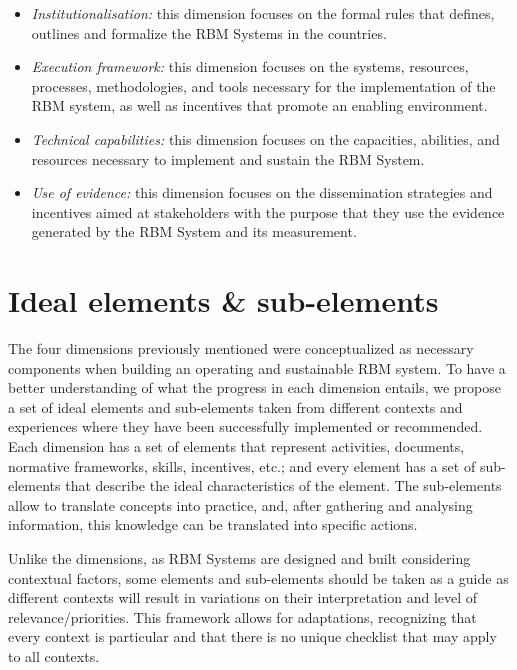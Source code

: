 \documentclass[
  10pt,
]{book}
\begin{document}
\begin{itemize}
\item
  \emph{Institutionalisation:} this dimension focuses on the formal rules that defines, outlines and formalize the RBM Systems in the countries.
\item
  \emph{Execution framework:} this dimension focuses on the systems, resources, processes, methodologies, and tools necessary for the implementation of the RBM system, as well as incentives that promote an enabling environment.
\item
  \emph{Technical capabilities:} this dimension focuses on the capacities, abilities, and resources necessary to implement and sustain the RBM System.
\item
  \emph{Use of evidence:} this dimension focuses on the dissemination strategies and incentives aimed at stakeholders with the purpose that they use the evidence generated by the RBM System and its measurement.
\end{itemize}

\hypertarget{ideal-elements-sub-elements}{%
\section{Ideal elements \& sub-elements}\label{ideal-elements-sub-elements}}

The four dimensions previously mentioned were conceptualized as necessary components when building an operating and sustainable RBM system. To have a better understanding of what the progress in each dimension entails, we propose a set of ideal elements and sub-elements taken from different contexts and experiences where they have been successfully implemented or recommended. Each dimension has a set of elements that represent activities, documents, normative frameworks, skills, incentives, etc.; and every element has a set of sub-elements that describe the ideal characteristics of the element. The sub-elements allow to translate concepts into practice, and, after gathering and analysing information, this knowledge can be translated into specific actions.

Unlike the dimensions, as RBM Systems are designed and built considering contextual factors, some elements and sub-elements should be taken as a guide as different contexts will result in variations on their interpretation and level of relevance/priorities. This framework allows for adaptations, recognizing that every context is particular and that there is no unique checklist that may apply to all contexts.
\end{document}
